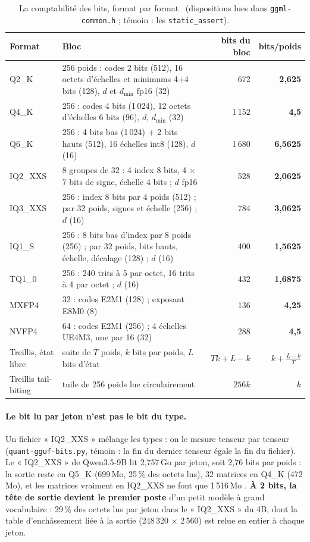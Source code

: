 \begin{table}[ht]
\centering\small
\caption[Bits par poids, format par format]{La comptabilité des bits, format par format \calc~(dispositions lues dans \texttt{ggml-common.h} ; témoin : les \texttt{static\_assert}).}
\label{tab:bits-formats}
\begin{tabularx}{\linewidth}{@{}lXrr@{}}
\toprule
Format & Bloc & bits du bloc & bits/poids \\
\midrule
Q2\_K & 256 poids : codes 2 bits (512), 16 octets d'échelles et minimums 4+4 bits (128), $d$ et $d_{\min}$ fp16 (32) & 672 & \textbf{2,625} \\
Q4\_K & 256 : codes 4 bits (1\,024), 12 octets d'échelles 6 bits (96), $d$, $d_{\min}$ (32) & 1\,152 & \textbf{4,5} \\
Q6\_K & 256 : 4 bits bas (1\,024) + 2 bits hauts (512), 16 échelles int8 (128), $d$ (16) & 1\,680 & \textbf{6,5625} \\
IQ2\_XXS & 8 groupes de 32 : 4 index 8 bits, 4 $\times$ 7 bits de signe, échelle 4 bits ; $d$ fp16 & 528 & \textbf{2,0625} \\
IQ3\_XXS & 256 : index 8 bits par 4 poids (512) ; par 32 poids, signes et échelle (256) ; $d$ (16) & 784 & \textbf{3,0625} \\
IQ1\_S & 256 : 8 bits bas d'index par 8 poids (256) ; par 32 poids, bits hauts, échelle, décalage (128) ; $d$ (16) & 400 & \textbf{1,5625} \\
TQ1\_0 & 256 : 240 trits à 5 par octet, 16 trits à 4 par octet ; $d$ (16) & 432 & \textbf{1,6875} \\
MXFP4 & 32 : codes E2M1 (128) ; exposant E8M0 (8) & 136 & \textbf{4,25} \\
NVFP4 & 64 : codes E2M1 (256) ; 4 échelles UE4M3, une par 16 (32) & 288 & \textbf{4,5} \\
Treillis, état libre & suite de $T$ poids, $k$ bits par poids, $L$ bits d'état & $Tk + L - k$ & $k + \frac{L-k}{T}$ \\
Treillis tail-biting & tuile de 256 poids lue circulairement & $256k$ & $k$ \\
\bottomrule
\end{tabularx}
\end{table}

\paragraph{Le bit lu par jeton n'est pas le bit du type.} Un fichier « IQ2\_XXS » mélange les types : on le mesure tenseur par tenseur (\texttt{quant-gguf-bits.py}, témoin : la fin du dernier tenseur égale la fin du fichier). Le « IQ2\_XXS » de Qwen3.5-9B lit 2,757\,Go par jeton, soit 2,76 bits par poids : la sortie reste en Q5\_K (699\,Mo, 25\,\% des octets lus), 32 matrices en Q4\_K (472\,Mo), et les matrices vraiment en IQ2\_XXS ne font que 1\,516\,Mo \mes. \textbf{À 2 bits, la tête de sortie devient le premier poste} d'un petit modèle à grand vocabulaire : 29\,\% des octets lus par jeton dans le « IQ2\_XXS » du 4B, dont la table d'enchâssement liée à la sortie (248\,320 $\times$ 2\,560) est relue en entier à chaque jeton.

